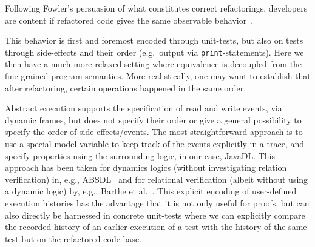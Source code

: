 Following Fowler's persuasion of what constitutes correct refactorings, developers are content if refactored code gives the same observable behavior~\cite{fowler:refactoring2nd}.

This behavior is first and foremost encoded through unit-tests, but also on tests through side-effects and their order (e.g.\ output via \texttt{print}-statements).
Here we then have a much more relaxed setting where equivalence is decoupled from the fine-grained program semantics.
More realistically, one may want to establish that after refactoring, certain operations happened in the same order.

Abstract execution supports the specification of read and write events, via dynamic frames, but does not specify their order or give a general possibility to
specify the order of side-effects/events. The most straightforward approach is to use a special model variable to keep track of the events explicitly in a trace, 
and specify properties using the surrounding logic, in our case, JavaDL. This approach has been taken for dynamics logics (without investigating relation verification) in, e.g., ABSDL~\cite{DBLP:journals/jlp/DinO14} and for relational verification (albeit without using a dynamic logic) by, e.g., Barthe et al.~\cite{DBLP:conf/fmcad/BartheEGGKM19}.
This explicit encoding of user-defined execution histories has the advantage that it is not only useful for proofs, but can also directly be harnessed in concrete unit-tests where we can explicitly compare the recorded history of an earlier execution of a test with the history of the same test but on the refactored code base.

